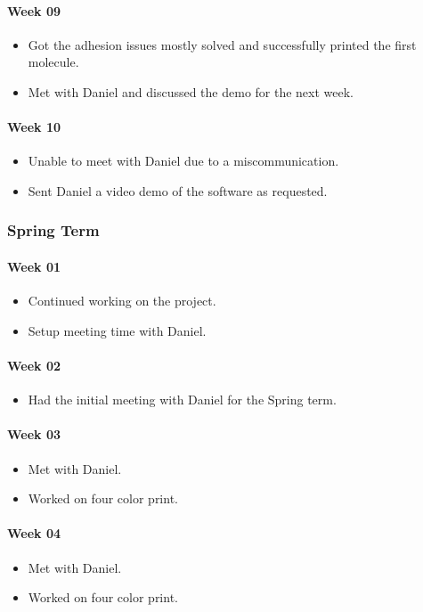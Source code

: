 \paragraph{Week 09}
\begin{itemize}
\item Got the adhesion issues mostly solved and successfully printed the first molecule. 
\item Met with Daniel and discussed the demo for the next week. 
\end{itemize}
\paragraph{Week 10}
\begin{itemize}
\item Unable to meet with Daniel due to a miscommunication. 
\item Sent Daniel a video demo of the software as requested.
\end{itemize}

\subsubsection{Spring Term}
\paragraph{Week 01}
\begin{itemize}
\item Continued working on the project. 
\item Setup meeting time with Daniel.
\end{itemize}
\paragraph{Week 02}
\begin{itemize}
\item Had the initial meeting with Daniel for the Spring term. 
\end{itemize}
\paragraph{Week 03}
\begin{itemize}
\item Met with Daniel. 
\item Worked on four color print.
\end{itemize}
\paragraph{Week 04}
\begin{itemize}
\item Met with Daniel. 
\item Worked on four color print.
\end{itemize}
